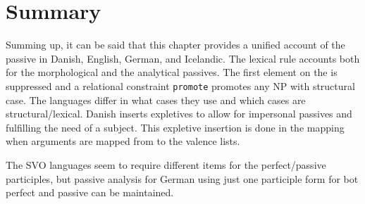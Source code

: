 



\section{Summary}

Summing up, it can be said that this chapter provides a unified account of the passive in Danish,
English, German, and Icelandic. The lexical rule accounts both for the morphological and the
analytical passives. The first element on the \argstl is suppressed and a relational constraint
\texttt{promote} promotes any NP with structural case. The languages differ in what cases they use and
which cases are structural/lexical. Danish inserts expletives to allow for impersonal passives and
fulfilling the need of a subject. This expletive insertion is done in the \argst mapping when
arguments are mapped from \argst to the valence lists.

The SVO languages seem to require different items for the perfect/passive participles, but 
passive analysis for German using just one participle form for bot perfect and passive can be maintained.










